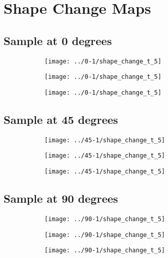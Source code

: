 \documentclass[12pt]{article}
\begin{document}
\section{Shape Change Maps}

\subsection{Sample at 0 degrees}
\begin{figure}[H]
    \centering
    \begin{subfigure}[b]{0.31\textwidth}
        \texttt{[image: ../0-1/shape\_change\_t\_5]}
    \end{subfigure}
    \begin{subfigure}[b]{0.31\textwidth}
        \texttt{[image: ../0-1/shape\_change\_t\_5]}
    \end{subfigure}
    \begin{subfigure}[b]{0.31\textwidth}
        \texttt{[image: ../0-1/shape\_change\_t\_5]}
    \end{subfigure}
\end{figure}


\subsection{Sample at 45 degrees}
\begin{figure}[H]
    \centering
    \begin{subfigure}[b]{0.31\textwidth}
        \texttt{[image: ../45-1/shape\_change\_t\_5]}
    \end{subfigure}
    \begin{subfigure}[b]{0.31\textwidth}
        \texttt{[image: ../45-1/shape\_change\_t\_5]}
    \end{subfigure}
    \begin{subfigure}[b]{0.31\textwidth}
        \texttt{[image: ../45-1/shape\_change\_t\_5]}
    \end{subfigure}
\end{figure}

\subsection{Sample at 90 degrees}
\begin{figure}[H]
    \centering
    \begin{subfigure}[b]{0.31\textwidth}
        \texttt{[image: ../90-1/shape\_change\_t\_5]}
    \end{subfigure}
    \begin{subfigure}[b]{0.31\textwidth}
        \texttt{[image: ../90-1/shape\_change\_t\_5]}
    \end{subfigure}
    \begin{subfigure}[b]{0.31\textwidth}
        \texttt{[image: ../90-1/shape\_change\_t\_5]}
    \end{subfigure}
\end{figure}
\end{document}
